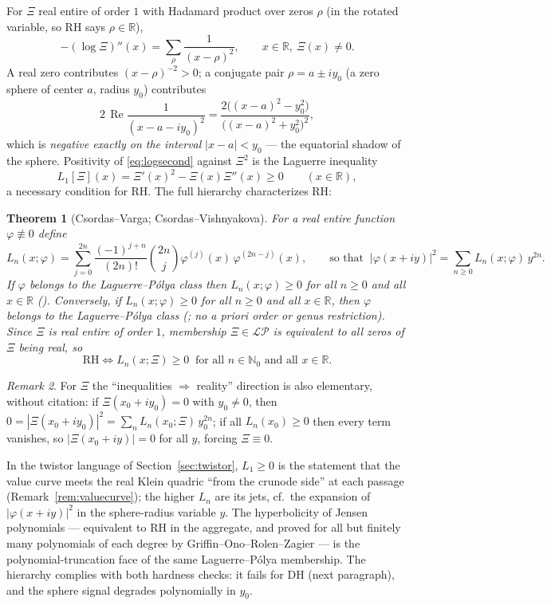 \documentclass[11pt]{amsart}
\theoremstyle{plain}
\newtheorem{theorem}{Theorem}[section]
\theoremstyle{definition}
\theoremstyle{remark}
\newtheorem{remark}[theorem]{Remark}
\newcommand{\RR}{\mathbb{R}}
\newcommand{\NN}{\mathbb{N}}
\newcommand{\re}{\operatorname{Re}}
\newcommand{\LP}{\mathcal{LP}}
\begin{document}
For $\Xi$ real entire of order $1$ with Hadamard product over zeros $\rho$ (in the rotated
variable, so RH says $\rho\in\RR$),
\begin{equation}\label{eq:logsecond}
-(\log\Xi)''(x)=\sum_\rho\frac{1}{(x-\rho)^2},\qquad x\in\RR,\ \Xi(x)\neq0 .
\end{equation}
A real zero contributes $(x-\rho)^{-2}>0$; a conjugate pair $\rho=a\pm iy_0$ (a zero sphere of
center $a$, radius $y_0$) contributes
\[
2\,\re\frac{1}{(x-a-iy_0)^2}
=\frac{2\bigl((x-a)^2-y_0^2\bigr)}{\bigl((x-a)^2+y_0^2\bigr)^2},
\]
which is \emph{negative exactly on the interval} $|x-a|<y_0$ --- the equatorial shadow of the
sphere. Positivity of \eqref{eq:logsecond} against $\Xi^2$ is the Laguerre inequality
\[
L_1[\Xi](x)=\Xi'(x)^2-\Xi(x)\Xi''(x)\ge0\qquad(x\in\RR),
\]
a necessary condition for RH. The full hierarchy characterizes RH:

\begin{theorem}[Csordas--Varga; Csordas--Vishnyakova]\label{thm:laguerre}
For a real entire function $\varphi\not\equiv0$ define
\[
L_n(x;\varphi)=\sum_{j=0}^{2n}\frac{(-1)^{j+n}}{(2n)!}\binom{2n}{j}
\varphi^{(j)}(x)\,\varphi^{(2n-j)}(x),
\qquad\text{so that }\ |\varphi(x+iy)|^2=\sum_{n\ge0}L_n(x;\varphi)\,y^{2n}.
\]
If $\varphi$ belongs to the Laguerre--P\'olya class then $L_n(x;\varphi)\ge0$ for all $n\ge0$ and
all $x\in\RR$ \textup{(\cite[Theorem~2.9]{CsordasVarga1990})}. Conversely, if
$L_n(x;\varphi)\ge0$ for all $n\ge0$ and all $x\in\RR$, then $\varphi$ belongs to the
Laguerre--P\'olya class \textup{(\cite[Theorem~2.3]{CsordasVishnyakova2013}; no a priori
order or genus restriction)}. Since $\Xi$ is real entire of order $1$, membership
$\Xi\in\LP$ is equivalent to all zeros of $\Xi$ being real, so
\[
\text{RH}\iff L_n(x;\Xi)\ge0\ \text{ for all }n\in\NN_0\text{ and all }x\in\RR .
\]
\end{theorem}

\begin{remark}
For $\Xi$ the ``inequalities $\Rightarrow$ reality'' direction is also elementary, without
citation: if $\Xi(x_0+iy_0)=0$ with $y_0\neq0$, then
$0=|\Xi(x_0+iy_0)|^2=\sum_nL_n(x_0;\Xi)\,y_0^{2n}$; if all $L_n(x_0)\ge0$ then every term
vanishes, so $|\Xi(x_0+iy)|=0$ for all $y$, forcing $\Xi\equiv0$.
\end{remark}

In the twistor language of Section~\ref{sec:twistor}, $L_1\ge0$ is the statement that the value
curve meets the real Klein quadric ``from the crunode side'' at each passage
(Remark~\ref{rem:valuecurve}); the higher $L_n$ are its jets, cf.\ the expansion of
$|\varphi(x+iy)|^2$ in the sphere-radius variable $y$. The hyperbolicity of Jensen polynomials
--- equivalent to RH in the aggregate, and proved for all but finitely many polynomials of each
degree by Griffin--Ono--Rolen--Zagier \cite{GORZ2019} --- is the polynomial-truncation face of
the same Laguerre--P\'olya membership. The hierarchy complies with both hardness
checks: it fails for DH (next paragraph), and the sphere signal degrades polynomially in $y_0$.
\end{document}
